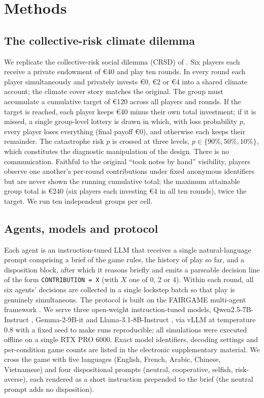 
\section{Methods}

\subsection{The collective-risk climate dilemma}
We replicate the collective-risk social dilemma (CRSD) of \textcite{milinski2008climate}. Six players each receive a private endowment of €40 and play ten rounds. In every round each player simultaneously and privately invests €0, €2 or €4 into a shared climate account; the climate cover story matches the original. The group must accumulate a cumulative target of €120 across all players and rounds. If the target is reached, each player keeps €40 minus their own total investment; if it is missed, a single group-level lottery is drawn in which, with loss probability $p$, every player loses everything (final payoff €0), and otherwise each keeps their remainder. The catastrophe risk $p$ is crossed at three levels, $p\in\{90\%,50\%,10\%\}$, which constitutes the diagnostic manipulation of the design. There is no communication. Faithful to the original ``took notes by hand'' visibility, players observe one another's per-round contributions under fixed anonymous identifiers but are never shown the running cumulative total; the maximum attainable group total is €240 (six players each investing €4 in all ten rounds), twice the target. We run ten independent groups per cell.

\subsection{Agents, models and protocol}
Each agent is an instruction-tuned LLM that receives a single natural-language prompt comprising a brief of the game rules, the history of play so far, and a disposition block, after which it reasons briefly and emits a parseable decision line of the form \texttt{CONTRIBUTION = X} (with $X$ one of 0, 2 or 4). Within each round, all six agents' decisions are collected in a single lockstep batch so that play is genuinely simultaneous. The protocol is built on the FAIRGAME multi-agent framework \parencite{fairgame2025}. We serve three open-weight instruction-tuned models, Qwen2.5-7B-Instruct \parencite{qwen2025}, Gemma-2-9B-it \parencite{gemma2024} and Llama-3.1-8B-Instruct \parencite{llama2024}, via vLLM at temperature 0.8 with a fixed seed to make runs reproducible; all simulations were executed offline on a single RTX PRO 6000. Exact model identifiers, decoding settings and per-condition game counts are listed in the electronic supplementary material. We cross the game with five languages (English, French, Arabic, Chinese, Vietnamese) and four dispositional prompts (neutral, cooperative, selfish, risk-averse), each rendered as a short instruction prepended to the brief (the neutral prompt adds no disposition).


